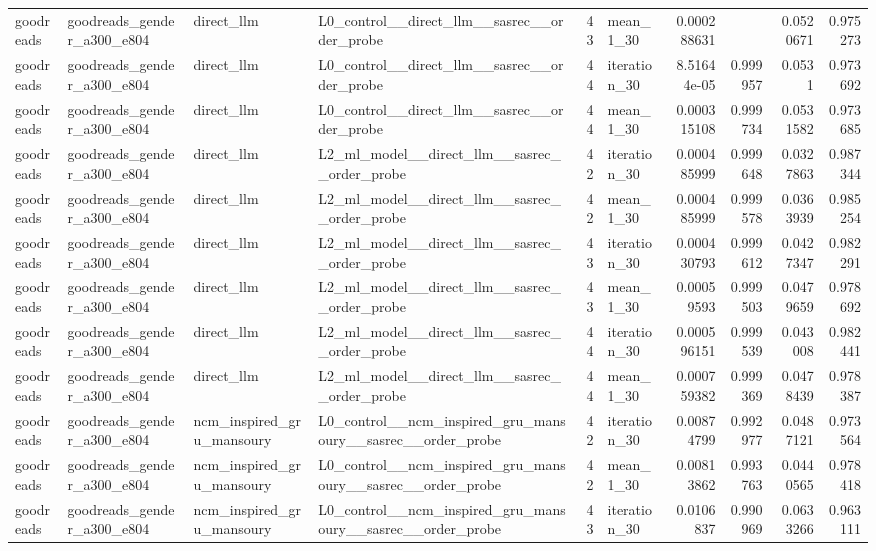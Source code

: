 \begin{table}[htbp!]
\begin{tabular}{llllrlrrrr}
goodreads & goodreads\_gender\_a300\_e804 & direct\_llm & L0\_control\_\_direct\_llm\_\_sasrec\_\_order\_probe & 43 & mean\_1\_30 & 0.000288631 & \textemdash{} & 0.0520671 & 0.975273 \\
goodreads & goodreads\_gender\_a300\_e804 & direct\_llm & L0\_control\_\_direct\_llm\_\_sasrec\_\_order\_probe & 44 & iteration\_30 & 8.51644e-05 & 0.999957 & 0.0531 & 0.973692 \\
goodreads & goodreads\_gender\_a300\_e804 & direct\_llm & L0\_control\_\_direct\_llm\_\_sasrec\_\_order\_probe & 44 & mean\_1\_30 & 0.000315108 & 0.999734 & 0.0531582 & 0.973685 \\
goodreads & goodreads\_gender\_a300\_e804 & direct\_llm & L2\_ml\_model\_\_direct\_llm\_\_sasrec\_\_order\_probe & 42 & iteration\_30 & 0.000485999 & 0.999648 & 0.0327863 & 0.987344 \\
goodreads & goodreads\_gender\_a300\_e804 & direct\_llm & L2\_ml\_model\_\_direct\_llm\_\_sasrec\_\_order\_probe & 42 & mean\_1\_30 & 0.000485999 & 0.999578 & 0.0363939 & 0.985254 \\
goodreads & goodreads\_gender\_a300\_e804 & direct\_llm & L2\_ml\_model\_\_direct\_llm\_\_sasrec\_\_order\_probe & 43 & iteration\_30 & 0.000430793 & 0.999612 & 0.0427347 & 0.982291 \\
goodreads & goodreads\_gender\_a300\_e804 & direct\_llm & L2\_ml\_model\_\_direct\_llm\_\_sasrec\_\_order\_probe & 43 & mean\_1\_30 & 0.00059593 & 0.999503 & 0.0479659 & 0.978692 \\
goodreads & goodreads\_gender\_a300\_e804 & direct\_llm & L2\_ml\_model\_\_direct\_llm\_\_sasrec\_\_order\_probe & 44 & iteration\_30 & 0.000596151 & 0.999539 & 0.043008 & 0.982441 \\
goodreads & goodreads\_gender\_a300\_e804 & direct\_llm & L2\_ml\_model\_\_direct\_llm\_\_sasrec\_\_order\_probe & 44 & mean\_1\_30 & 0.000759382 & 0.999369 & 0.0478439 & 0.978387 \\
goodreads & goodreads\_gender\_a300\_e804 & ncm\_inspired\_gru\_mansoury & L0\_control\_\_ncm\_inspired\_gru\_mansoury\_\_sasrec\_\_order\_probe & 42 & iteration\_30 & 0.00874799 & 0.992977 & 0.0487121 & 0.973564 \\
goodreads & goodreads\_gender\_a300\_e804 & ncm\_inspired\_gru\_mansoury & L0\_control\_\_ncm\_inspired\_gru\_mansoury\_\_sasrec\_\_order\_probe & 42 & mean\_1\_30 & 0.00813862 & 0.993763 & 0.0440565 & 0.978418 \\
goodreads & goodreads\_gender\_a300\_e804 & ncm\_inspired\_gru\_mansoury & L0\_control\_\_ncm\_inspired\_gru\_mansoury\_\_sasrec\_\_order\_probe & 43 & iteration\_30 & 0.0106837 & 0.990969 & 0.0633266 & 0.963111 \\

\end{tabular}
\end{table}

